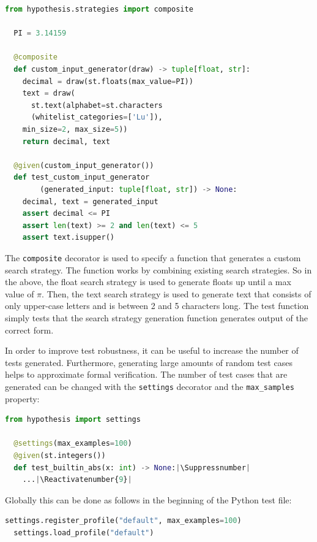 \documentclass[runningheads]{llncs}
\makeatletter
\let\origthelstnumber\thelstnumber
\newcommand*\Suppressnumber{%
  \lst@AddToHook{OnNewLine}{%
    \let\thelstnumber\relax%
     \advance\c@lstnumber-\@ne\relax%
    }%
}
\newcommand*\Reactivatenumber[1]{%
  \setcounter{lstnumber}{\numexpr#1-1\relax}
  \lst@AddToHook{OnNewLine}{%
   \let\thelstnumber\origthelstnumber%
   \refstepcounter{lstnumber}%
  }%
}
\makeatother
\begin{document}
\begin{lstlisting}[language=Python,caption={Complex Inputs from code/tutorial.ipynb}]
  from hypothesis.strategies import composite

  PI = 3.14159

  @composite
  def custom_input_generator(draw) -> tuple[float, str]:
    decimal = draw(st.floats(max_value=PI))
    text = draw(
      st.text(alphabet=st.characters
      (whitelist_categories=['Lu']), 
    min_size=2, max_size=5))
    return decimal, text

  @given(custom_input_generator())
  def test_custom_input_generator
        (generated_input: tuple[float, str]) -> None:
    decimal, text = generated_input
    assert decimal <= PI
    assert len(text) >= 2 and len(text) <= 5
    assert text.isupper()
\end{lstlisting}
The \texttt{composite} decorator is used to specify a function that generates a custom search strategy. The function works by combining existing search strategies. So in the above, the float search strategy is used to generate floats up until a max value of $\pi$. Then, the text search strategy is used to generate text that consists of only upper-case letters and is between 2 and 5 characters long. The test function simply tests that the search strategy generation function generates output of the correct form.

\vspace{5mm}
\noindent In order to improve test robustness, it can be useful to increase the number of tests generated. Furthermore, generating large amounts of random test cases helps to approximate formal verification. The number of test cases that are generated can be changed with the \texttt{settings} decorator and the \texttt{max\_samples} property:

\begin{lstlisting}[language=Python,caption={Specifying Test Case Amount from code/tutorial.ipynb}]
  from hypothesis import settings

  @settings(max_examples=100)
  @given(st.integers())
  def test_builtin_abs(x: int) -> None:|\Suppressnumber|
    ...|\Reactivatenumber{9}|

\end{lstlisting}

\noindent Globally this can be done as follows in the beginning of the Python test file:
\begin{lstlisting}[language=Python,caption={Specifying Test Case Amount from code/tutorial.ipynb}]
  settings.register_profile("default", max_examples=100)
  settings.load_profile("default")
\end{lstlisting}
\end{document}
